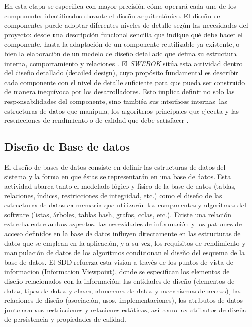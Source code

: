 \documentclass[12pt, letterpaper, oneside]{book}
\begin{document}
En esta etapa se especifica con mayor precisión cómo operará cada uno de los componentes identificados durante el diseño arquitectónico. El diseño de componentes puede adoptar diferentes niveles de detalle según las necesidades del proyecto: desde una descripción funcional sencilla que indique qué debe hacer el componente, hasta la adaptación de un componente reutilizable ya existente, o bien la elaboración de un modelo de diseño detallado que defina su estructura interna, comportamiento y relaciones \cite{Sommerville2015-px}. El \textit{SWEBOK} sitúa esta actividad dentro del diseño detallado (detailed design), cuyo propósito fundamental es describir cada componente con el nivel de detalle suficiente para que pueda ser construido de manera inequívoca por los desarrolladores. Esto implica definir no solo las responsabilidades del componente, sino también sus interfaces internas, las estructuras de datos que manipula, los algoritmos principales que ejecuta y las restricciones de rendimiento o de calidad que debe satisfacer \cite{swebok2024}.

\subsection{Diseño de Base de datos}
El diseño de bases de datos consiste en definir las estructuras de datos del sistema y la forma en que éstas se representarán en una base de datos. Esta actividad abarca tanto el modelado lógico y físico de la base de datos (tablas, relaciones, índices, restricciones de integridad, etc.) como el diseño de las estructuras de datos en memoria que utilizarán los componentes y algoritmos del software (listas, árboles, tablas hash, grafos, colas, etc.)\cite{Sommerville2015-px}. Existe una relación estrecha entre ambos aspectos: las necesidades de información y los patrones de acceso definidos en la base de datos influyen directamente en las estructuras de datos que se emplean en la aplicación, y a su vez, los requisitos de rendimiento y manipulación de datos de los algoritmos condicionan el diseño del esquema de la base de datos.
El SDD \cite{1016_2009} refuerza esta visión a través de los puntos de vista de informacion (Information Viewpoint), donde se especifican los elementos de diseño relacionados con la información: las entidades de diseño (elementos de datos, tipos de datos y clases, almacenes de datos y mecanismos de acceso), las relaciones de diseño (asociación, usos, implementaciones), los atributos de datos junto con sus restricciones y relaciones estáticas, así como los atributos de diseño de persistencia y propiedades de calidad.
\end{document}
